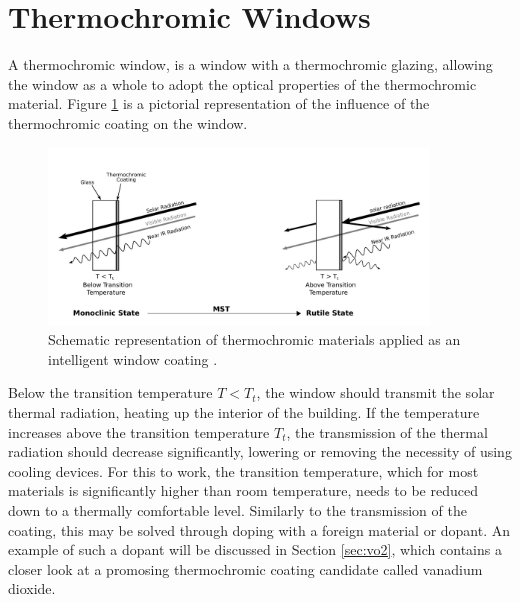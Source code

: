 \newpage
\section{Thermochromic Windows}
A thermochromic window, is a window
with a thermochromic glazing, allowing the window as a whole to adopt the 
optical properties of the thermochromic material. Figure \ref{fig:TCcoating} is a pictorial representation
of the influence of the thermochromic coating on the window. 
%
\begin{figure}[h!]
  \centering
   \includegraphics[width=0.9\textwidth]{Figures/TCcoating2.pdf}
   \caption{Schematic representation of thermochromic materials applied as an 
   intelligent window coating \cite{Kiri2010}.
   }
   \label{fig:TCcoating}
\end{figure}
%
Below the transition temperature $T<T_t$, the window should transmit the solar thermal radiation, heating 
up the interior of the building. If the temperature increases above the transition temperature $T_t$,
the transmission of the thermal radiation should decrease significantly, lowering or removing
the necessity of using cooling devices. 
For this to work, the transition temperature, which for most materials is significantly higher 
than room temperature, needs to be reduced down to a thermally comfortable level. 
Similarly to the transmission of the coating, this may be solved through doping with a foreign
material or dopant. An example of such a dopant will be discussed in Section \ref{sec:vo2},
which contains a closer look at a promosing thermochromic coating candidate called vanadium dioxide.
\\
\\
%
